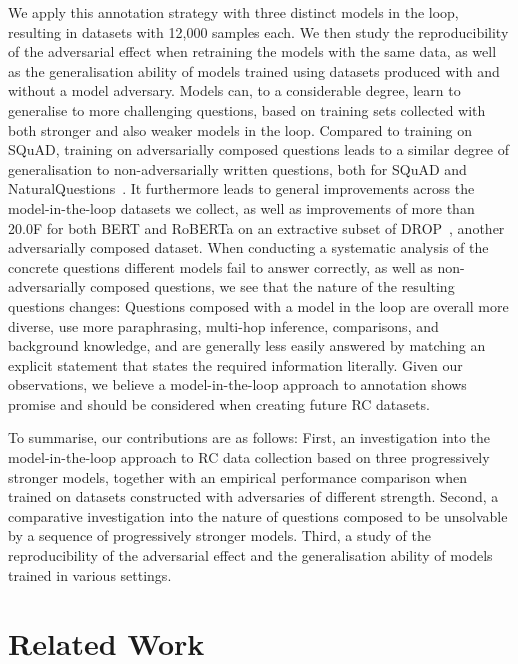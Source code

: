 \documentclass[11pt,a4paper]{article}
\newcommand{\squad}{SQuAD}
\newcommand{\drop}{DROP}
\newcommand{\naturalquestions}{NaturalQuestions}
\begin{document}
We apply this annotation strategy with three distinct models in the loop, resulting in datasets with 12,000 samples each.
We then study the reproducibility of the adversarial effect when retraining the models with the same data, as well as the generalisation ability of models trained using datasets produced with and without a model adversary.
Models can, to a considerable degree, learn to generalise to more challenging questions, based on training sets collected with both stronger and also weaker models in the loop.
Compared to training on \squad{}, training on adversarially composed questions leads to a similar degree of generalisation to non-adversarially written questions, both for \squad{} and \naturalquestions{}~\cite{kwiatkowski-etal-2019-natural}.
It furthermore leads to general improvements across the model-in-the-loop datasets we collect, as well as improvements of more than 20.0F for both BERT and RoBERTa on an extractive subset of \drop{}~\cite{dua2019drop}, another adversarially composed dataset.
When conducting a systematic analysis of the concrete questions different models fail to answer correctly, as well as non-adversarially composed questions, we see that the nature of the resulting questions changes:
Questions composed with a model in the loop are overall more diverse, use more paraphrasing, multi-hop inference, comparisons, and background knowledge, and are generally less easily answered by matching an explicit statement that states the required information literally.
Given our observations, we believe a model-in-the-loop approach to annotation shows promise and should be considered when creating future RC datasets.


To summarise, our contributions are as follows:
First, an investigation into the model-in-the-loop approach to RC data collection based on three progressively stronger models, together with an empirical performance comparison when trained on datasets constructed with adversaries of different strength.
Second, a comparative investigation into the nature of questions composed to be unsolvable by a sequence of progressively stronger models.
Third, a study of the reproducibility of the adversarial effect and the generalisation ability of models trained in various settings.

\section{Related Work}
\end{document}
